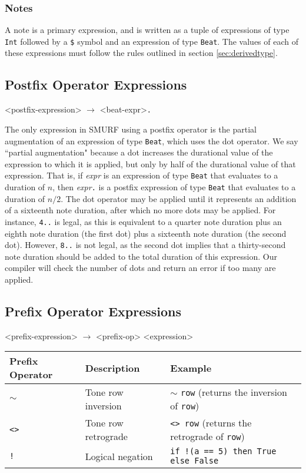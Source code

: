 \subsubsection{Notes}
A note is a primary expression, and is written as a tuple of expressions of type \texttt{Int} followed
by a \texttt{\$} symbol and an expression of type \texttt{Beat}. The values of each of these
expressions must follow the rules outlined in section \ref{sec:derivedtype}.

\subsection{Postfix Operator Expressions}
\label{sec:postfixop}

\begin{grammar}
<postfix-expression> $\rightarrow$ <beat-expr>\texttt{.}
\end{grammar}

The only expression in SMURF using a postfix operator is the partial augmentation of an expression
of type \texttt{Beat}, which uses the dot operator.
We say ``partial augmentation" because a dot increases the durational value of
the expression to which it is applied, but only by half of the durational value of that expression.
That is, if \emph{expr} is an expression of type \texttt{Beat} that evaluates to a duration of $n$, 
then \emph{expr}\texttt{.} is a postfix expression of type \texttt{Beat} 
that evaluates to a duration of $n/2$.
The dot operator may be applied until it represents an addition of a sixteenth note
duration, after which no more dots may be applied. For instance, \texttt{4..} is legal, as this
is equivalent to a quarter note duration plus an eighth note duration (the first dot) plus a
sixteenth note duration (the second dot). However, \texttt{8..} is not legal, as the second
dot implies that a thirty-second note duration should be added to the total duration of this
expression. Our compiler will check the number of dots and return an error if too many are applied.

\subsection{Prefix Operator Expressions}
\label{sec:prefixop}
\begin{grammar}
<prefix-expression> $\rightarrow$ <prefix-op> <expression>
\end{grammar}


\begin{table} [H]
\centering
\begin{tabularx}{0.9\textwidth}{llX}
\hline\hline
Prefix Operator & Description & Example \\
\hline\hline
   \texttt{$\sim$} & Tone row inversion & $\sim$ \texttt{row} (returns the inversion of \texttt{row})\\ \hline
   \texttt{<>} & Tone row retrograde & \texttt{<>}~\texttt{row} (returns the
           retrograde of \texttt{row})\\ \hline
   \texttt{!} & Logical negation & \texttt{if !(a == 5) then True else False} \\ \hline
\end{tabularx}
\end{table}

